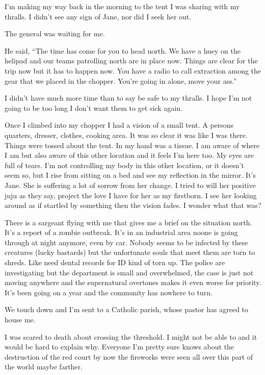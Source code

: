 \lettrine[lines=2,lraise=0]{I}'m making my way back in the morning to the tent I was sharing with my thralls. I didn't see any sign of Jane, nor did I seek her out. 



The general was waiting for me.

He said, ``The time has come for you to head north. We have a huey on the helipad and our teams patrolling north are in place now. Things are clear for the trip now but it has to happen now. You have a radio to call extraction among the gear that we placed in the chopper. You're going in alone, move your ass.''

I didn't have much more time than to say be safe to my thralls. I hope I'm not going to be too long I don't want them to get sick again.

Once I climbed into my chopper I had a vision of a small tent. A persons quarters, dresser, clothes, cooking area. It was so clear it was like I was there. Things were tossed about the tent. In my hand was a tissue. I am aware of where I am but also aware of this other location and it feels I'm here too. My eyes are full of tears. I'm not controlling my body in this other location, or it doesn't seem so, but I rise from sitting on a bed and see my reflection in the mirror. It's Jane. She is suffering a lot of sorrow from her change. I tried to will her positive juju as they say, project the love I have for her as my firstborn. I see her looking around as if startled by something then the vision fades. I wonder what that was?

There is a sargeant flying with me that gives me a brief on the situation north. It's a report of a zombie outbreak. It's in an industrial area noone is going through at night anymore, even by car. Nobody seems to be infected by these creatures (lucky bastards) but the unfortunate souls that meet them are torn to shreds. Like need dental records for ID kind of torn up. The police are investigating but the department is small and overwhelmed, the case is just not moving anywhere and the supernatural overtones makes it even worse for priority. It's been going on a year and the community has nowhere to turn.

\parasep

We touch down and I'm sent to a Catholic parish, whose pastor has agreed to house me.

I was scared to death about crossing the threshold. I might not be able to and it would be hard to explain why. Everyone I'm pretty sure knows about the destruction of the red court by now the fireworks were seen all over this part of the world maybe farther.

